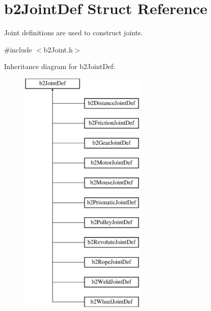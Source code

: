 \hypertarget{structb2_joint_def}{}\section{b2\+Joint\+Def Struct Reference}
\label{structb2_joint_def}


Joint definitions are used to construct joints.  




{\ttfamily \#include $<$b2\+Joint.\+h$>$}

Inheritance diagram for b2\+Joint\+Def\+:\begin{figure}[H]
\begin{center}
\leavevmode
\includegraphics[height=12.000000cm]{structb2_joint_def}
\end{center}
\end{figure}
